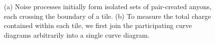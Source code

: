 \documentclass[aps, prl, letterpaper, twocolumn, superscriptaddress, notitlepage, 10pt]{revtex4}
\begin{document}
\begin{figure}[t!]
\begin{center}
\caption{
(a) Noise processes initially form isolated sets of pair-created anyons, 
each crossing the boundary of a tile. 
(b) To measure the total charge 
contained within each tile, 
we first join the participating curve 
diagrams arbitrarily into a single curve diagram.
}
\end{center}
\end{figure}
\end{document}
